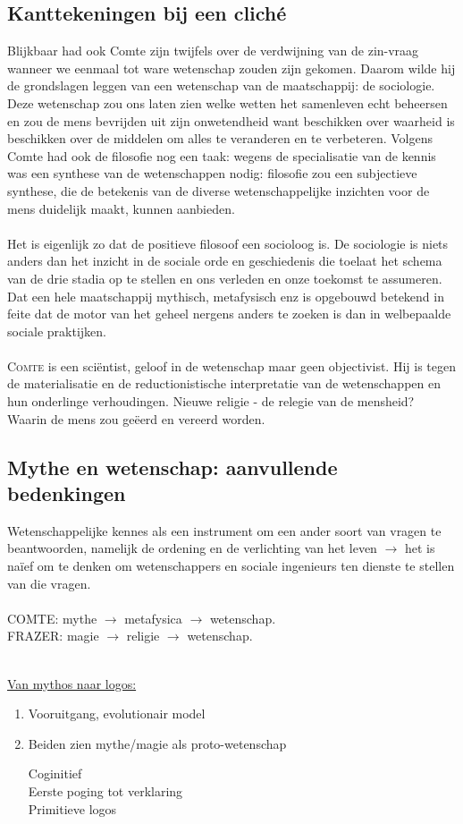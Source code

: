 \subsection{Kanttekeningen bij een clich\'e}
Blijkbaar had ook Comte zijn twijfels over de verdwijning van de zin-vraag wanneer we eenmaal tot ware wetenschap zouden zijn gekomen. Daarom wilde hij de grondslagen leggen van een wetenschap van de maatschappij: de sociologie. Deze wetenschap zou ons laten zien welke wetten het samenleven echt beheersen en zou de mens bevrijden uit zijn onwetendheid want beschikken over waarheid is beschikken over de middelen om alles te veranderen en te verbeteren.
Volgens Comte had ook de filosofie nog een taak: wegens de specialisatie van de kennis was een synthese van de wetenschappen nodig: filosofie zou een subjectieve synthese, die de betekenis van de diverse wetenschappelijke inzichten voor de mens duidelijk maakt, kunnen aanbieden.
\\
\\
Het is eigenlijk zo dat de positieve filosoof een socioloog is. De sociologie is niets anders dan het inzicht in de sociale orde en geschiedenis die toelaat het schema van de drie stadia op te stellen en ons verleden en onze toekomst te assumeren. Dat een hele maatschappij mythisch, metafysisch enz is opgebouwd betekend in feite dat de motor van het geheel nergens anders te zoeken is dan in welbepaalde sociale praktijken.
\\
\\
\textsc{Comte} is een sci\"entist, geloof in de wetenschap maar geen objectivist. Hij is tegen de materialisatie en de reductionistische interpretatie van de wetenschappen en hun onderlinge verhoudingen. Nieuwe religie - de relegie van de mensheid? Waarin de mens zou ge\"eerd en vereerd worden.
\subsection{Mythe en wetenschap: aanvullende bedenkingen}
Wetenschappelijke kennes als een instrument om een ander soort van vragen te beantwoorden, namelijk de ordening en de verlichting van het leven $\rightarrow$ het is na\"ief om te denken om wetenschappers en sociale ingenieurs ten dienste te stellen van die vragen.
\\
\\
COMTE: mythe $\longrightarrow$ metafysica $\longrightarrow$ wetenschap.
\\
FRAZER: magie $\longrightarrow$ religie $\longrightarrow$ wetenschap.
\\
\\
\begin{center}
\underline{Van mythos naar logos:}
\end{center}
\begin{enumerate}
\item Vooruitgang, evolutionair model
\item Beiden zien mythe/magie als proto-wetenschap
\begin{flushleft}
Coginitief\\
Eerste poging tot verklaring\\
Primitieve logos
\end{flushleft}
\end{enumerate}

